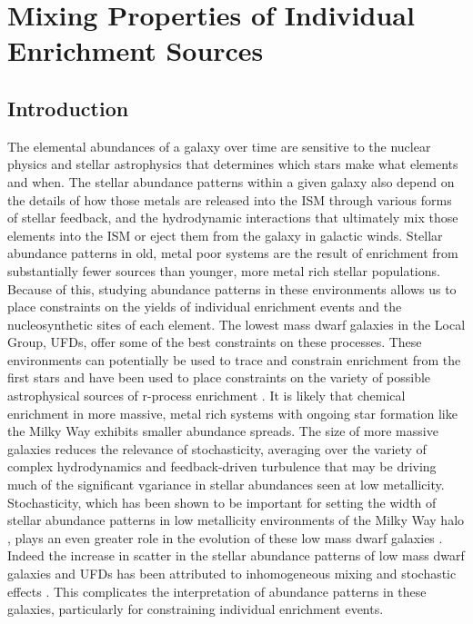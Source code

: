 \chapter[Mixing Properties of Individual Enrichment Sources]{Mixing Properties of Individual Enrichment Sources\label{ch:chapter4}}
\begingroup
\let\thefootnote\relax{}
\endgroup

%
%

\newcommand{\runone}{I\_}
\newcommand{\runonenu}{I}
\newcommand{\runtwo}{II\_}
\newcommand{\runtwonu}{II}

\section{Introduction}

The elemental abundances of a galaxy over time are sensitive to the nuclear physics and stellar astrophysics that determines which stars make what elements and when. The stellar abundance patterns within a given galaxy also depend on the details of how those metals are released into the ISM through various forms of stellar feedback, and the hydrodynamic interactions that ultimately mix those elements into the ISM or eject them from the galaxy in galactic winds. Stellar abundance patterns in old, metal poor systems are the result of enrichment from substantially fewer sources than younger, more metal rich stellar populations. Because of this, studying abundance patterns in these environments allows us to place constraints on the yields of individual enrichment events and the nucleosynthetic sites of each element. The lowest mass dwarf galaxies in the Local Group, UFDs, offer some of the best constraints on these processes. These environments can potentially be used to trace and constrain enrichment from the first stars \citep[e.g.][]{FrebelBromm2012,Ji2015,Ritter2015,Jeon2017,Hartwig2018} and have been used to place constraints on the variety of possible astrophysical sources of r-process enrichment \citep[e.g.][]{Ji2016a,Ji2016b,Ji2018a,Ji2019,Tsujimoto2017,Duggan2018,Nagasawa2018,Ojima2018}. It is likely that chemical enrichment in more massive, metal rich systems with ongoing star formation like the Milky Way exhibits smaller abundance spreads. The size of more massive galaxies reduces the relevance of stochasticity, averaging over the variety of complex hydrodynamics and feedback-driven turbulence that may be driving much of the significant vgariance in stellar abundances seen at low metallicity. Stochasticity, which has been shown to be important for setting the width of stellar abundance patterns in low metallicity environments of the Milky Way halo \citep[e.g.][]{Cescutti2008,Cescutti2014}, plays an even greater role in the evolution of these low mass dwarf galaxies \citep{Applebaum2018}. Indeed the increase in scatter in the stellar abundance patterns of low mass dwarf galaxies and UFDs has been attributed to inhomogeneous mixing and stochastic effects \citep[e.g.][]{Norris2010a,Lee2013,Simon2015,Mashonkina2017,Suda2017}. This complicates the interpretation of abundance patterns in these galaxies, particularly for constraining individual enrichment events.


